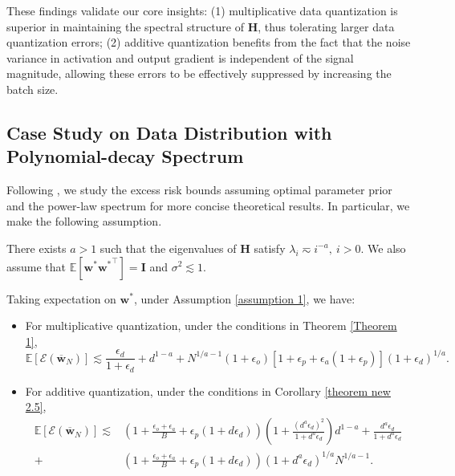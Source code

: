 \documentclass[11pt, letterpaper]{article}
\begin{document}
These findings validate our core insights: (1) multiplicative data quantization is superior in maintaining the spectral structure of $\mathbf{H}$, thus tolerating larger data quantization errors; (2) additive quantization benefits from the fact that the noise variance in activation and output gradient is independent of the signal magnitude, allowing these errors to be effectively suppressed by increasing the batch size.

\subsection{Case Study on Data Distribution with Polynomial-decay Spectrum}
\label{Case Study}
Following \cite{lin2024scaling,lin2025improved}, we study the excess risk bounds assuming optimal parameter prior and the power-law spectrum for more concise theoretical results. In particular, we make the following assumption.
\begin{assumption}
\label{assumption 1}
    There exists $a > 1$ such that the eigenvalues of $\mathbf{H}$ satisfy $\lambda_i \eqsim i^{-a},\  i >0$. We also assume that $\mathbb{E}\left[\mathbf{w}^*{\mathbf{w}^*}^\top\right]=\mathbf{I}$ and $\sigma^2 \lesssim 1$.
\end{assumption}
\begin{corollary}\label{coro: case study}
    Taking expectation on $\mathbf{w}^*$, under Assumption \ref{assumption 1}, we have:
    \begin{itemize}[leftmargin=*,nosep]
        \item For multiplicative quantization, under the conditions in Theorem \ref{Theorem 1},
        \begin{equation*}
            \mathbb{E}\left[\mathcal{E}(\overline{\mathbf{w}}_N)\right]\lesssim\frac{\epsilon_d}{1+\epsilon_d}+d^{1-a}+N^{1/a-1}(1+\epsilon_o) [1+\epsilon_p+\epsilon_a(1+\epsilon_p)](1+\epsilon_d)^{1/a}.
        \end{equation*}
        \item For additive quantization, under the conditions in Corollary \ref{theorem new 2.5},
        \begin{equation*}
            \begin{aligned}
                \mathbb{E}[\mathcal{E}(\overline{\mathbf{w}}_N)]\lesssim &\left(1+\frac{\epsilon_o+\epsilon_a}{B}+\epsilon_p(1+d\epsilon_d)\right)\left(1+\frac{(d^a\epsilon_d)^2}{1+d^a\epsilon_d}\right)d^{1-a}+\frac{d^a\epsilon_d}{1+d^a\epsilon_d}\\
                +&\left(1+\frac{\epsilon_o+\epsilon_a}{B}+\epsilon_p(1+d\epsilon_d)\right)(1+d^a\epsilon_d)^{1/a}N^{1/a-1}.
            \end{aligned}
        \end{equation*}
    \end{itemize}
\end{corollary}
\end{document}
